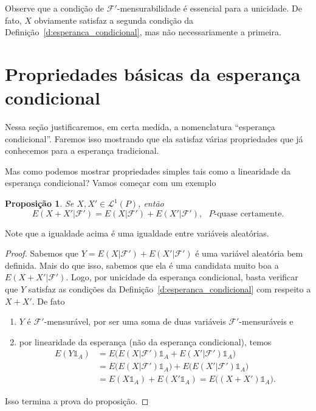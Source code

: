 \documentclass[reqno, draft]{book}
\newcommand*\1{\mathds{1}}
\newtheorem{proposition}[theorem]{Proposição}
\begin{document}
Observe que a condição de $\mathcal{F}'$-mensurabilidade é essencial para a unicidade.
De fato, $X$ obviamente satisfaz a segunda condição da Definição~\ref{d:esperanca_condicional}, mas não necessariamente a primeira.

\section{Propriedades básicas da esperança condicional}

Nessa seção justificaremos, em certa medida, a nomenclatura ``esperança condicional''.
Faremos isso mostrando que ela satisfaz várias propriedades que já conhecemos para a esperança tradicional.

Mas como podemos mostrar propriedades simples tais como a linearidade da esperança condicional?
Vamos começar com um exemplo

\begin{proposition}
  Se $X, X' \in \mathcal{L}^1(P)$, então
  \begin{equation}
    E(X + X'|\mathcal{F}') = E(X|\mathcal{F}') + E(X'|\mathcal{F}'), \text{ $P$-quase certamente.}
  \end{equation}
\end{proposition}

Note que a igualdade acima é uma igualdade entre variáveis aleatórias.

\begin{proof}
  Sabemos que $Y = E(X|\mathcal{F}') + E(X'|\mathcal{F}')$ é uma variável aleatória bem definida.
  Mais do que isso, sabemos que ela é uma candidata muito boa a $E(X + X'|\mathcal{F}')$.
  Logo, por unicidade da esperança condicional, basta verificar que $Y$ satisfaz as condições da Definição~\ref{d:esperanca_condicional} com respeito a $X + X'$.
  De fato
  \begin{enumerate}[\quad a)]
  \item $Y$ é $\mathcal{F}'$-mensurável, por ser uma soma de duas variáveis $\mathcal{F}'$-mensuráveis e
  \item por linearidade da esperança (não da esperança condicional), temos
    \begin{equation}
      \begin{split}
        E(Y \1_A) & = E\big( E(X|\mathcal{F}')\1_A + E(X'|\mathcal{F}')\1_A \big)\\
        & = E\big( E(X|\mathcal{F}')\1_A\big) + E\big(E(X'|\mathcal{F}')\1_A \big)\\
        & = E(X \1_A) + E(X' \1_A) = E\big( (X + X') \1_A \big).
      \end{split}
    \end{equation}
  \end{enumerate}
  Isso termina a prova do proposição.
\end{proof}
\end{document}
